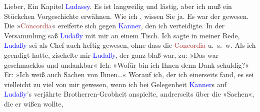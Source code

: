 \pstart{}Lieber,\pend
\pstart
           Ein Kapitel \textcolor{blue}{Ludassy}{}\ledrightnote{\textcolor{blue}{Julius von Gans-Ludassy}}. Es ist langweilig und
               lästig, aber ich muß ein Stückchen Vorgeschichte erwähnen. Wie ich \label{K_L03434-2v}\label{K_L03434-2h}, wissen Sie ja. Es war der \label{K_L03434-3v}\label{K_L03434-3h} gewesen. Die »\textcolor{brown}{Concordia}{}\ledrightnote{\textcolor{brown}{Concordia}}« ereiferte sich gegen \textcolor{blue}{Kanner}{}\ledrightnote{\textcolor{blue}{Heinrich Kanner}}, den ich verteidigte. In der Versammlung saß \textcolor{blue}{Ludaßy}{}\ledrightnote{\textcolor{blue}{Julius von Gans-Ludassy}} mit mir an einem Tisch. Ich sagte in meiner Rede, \textcolor{blue}{Ludaßy}{}\ledrightnote{\textcolor{blue}{Julius von Gans-Ludassy}} sei als Chef auch heftig gewesen, ohne
               dass die \textcolor{brown}{Concordia}{}\ledrightnote{\textcolor{brown}{Concordia}} u. s. w. Als ich geendigt
               hatte, zischelte mir \textcolor{blue}{Ludaßy}{}\ledrightnote{\textcolor{blue}{Julius von Gans-Ludassy}}, der ganz blaß
               war, zu: »Das war geschmacklos und undankbar{\dotstwo}« Ich: »Wofür
               bin ich Ihnen denn Dank schuldig?« Er: »Ich weiß auch Sachen von Ihnen{\dots}« Worauf ich, der ich einerseits fand, es sei vielleicht
               zu viel von mir gewesen, wenn ich bei Gelegenheit \textcolor{blue}{Kanner}{}\ledrightnote{\textcolor{blue}{Heinrich Kanner}}s auf \textcolor{blue}{Ludaßy}{}\ledrightnote{\textcolor{blue}{Julius von Gans-Ludassy}}’s verjährte
               Brotherren-Grobheit anspielte, andrerseits über die »Sachen«, die er wißen wollte,
